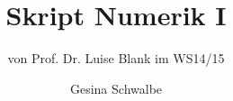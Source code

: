 \documentclass[ngerman,fontsize=11pt, paper=a4, parskip=half, titlepage=true, toc=bib]{scrbook}
\begin{document}
\frontmatter	%
\title{Skript Numerik I}
\subtitle{von Prof. Dr. Luise Blank im WS14/15}
\author{Gesina Schwalbe}
\maketitle
\tableofcontents


\mainmatter		%





















\nocite{*} %
\backmatter		%


\printindex		%

\printbibliography	%
\end{document}
